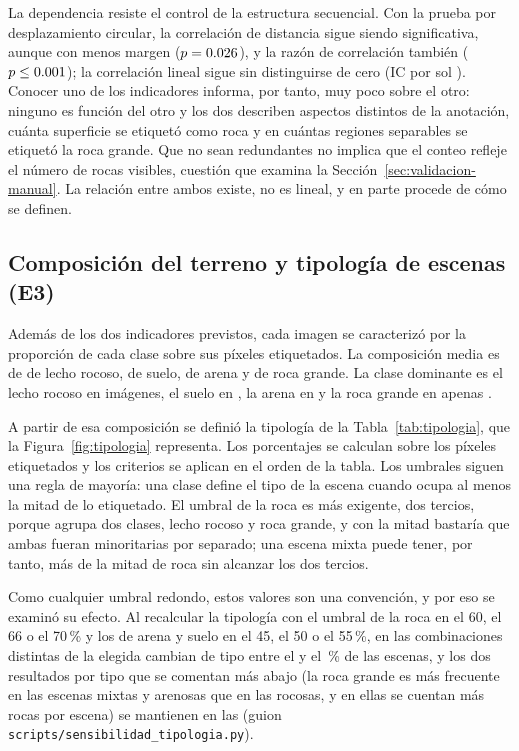 La dependencia resiste el control de la estructura secuencial. Con la prueba por
desplazamiento circular, la correlación de distancia sigue siendo significativa, aunque con
menos margen ($p = \num{0.026}$), y la razón de correlación también ($p \leq \num{0.001}$); la
correlación lineal sigue sin distinguirse de cero (IC por sol \cTempCCIC). Conocer uno
de los indicadores informa, por tanto, muy poco sobre el otro: ninguno es función del otro y
los dos describen aspectos distintos de la anotación, cuánta superficie se etiquetó como roca
y en cuántas regiones separables se etiquetó la roca grande. Que no sean redundantes no
implica que el conteo refleje el número de rocas visibles, cuestión que examina la
Sección~\ref{sec:validacion-manual}. La relación entre ambos existe, no es lineal, y en parte
procede de cómo se definen.

\subsection{Composición del terreno y tipología de escenas (E3)}

Además de los dos indicadores previstos, cada imagen se caracterizó por la proporción de
cada clase sobre sus píxeles etiquetados. La composición media es de \cCompBed{} de lecho
rocoso, \cCompSoil{} de suelo, \cCompSand{} de arena y \cCompBig{} de roca grande. La clase
dominante es el lecho rocoso en \cDomBed{} imágenes, el suelo en \cDomSoil, la arena en
\cDomSand{} y la roca grande en apenas \cDomBig.

A partir de esa composición se definió la tipología de la Tabla~\ref{tab:tipologia}, que la
Figura~\ref{fig:tipologia} representa. Los porcentajes se calculan sobre los píxeles
etiquetados y los criterios se aplican en el orden de la tabla. Los umbrales siguen una regla
de mayoría: una clase define el tipo de la escena cuando ocupa al menos la mitad de lo
etiquetado. El umbral de la roca es más exigente, dos tercios, porque agrupa dos clases, lecho
rocoso y roca grande, y con la mitad bastaría que ambas fueran minoritarias por separado; una
escena mixta puede tener, por tanto, más de la mitad de roca sin alcanzar los dos tercios.

Como cualquier umbral redondo, estos valores son una convención, y por eso se examinó su
efecto. Al recalcular la tipología con el umbral de la roca en el 60, el 66 o el 70\,\% y los
de arena y suelo en el 45, el 50 o el 55\,\%, en las \cTipoSensN{} combinaciones distintas de
la elegida cambian de tipo entre el \cTipoSensCambioMin{} y el \cTipoSensCambioMax\,\% de las
escenas, y los dos resultados por tipo que se comentan más abajo (la roca grande es más
frecuente en las escenas mixtas y arenosas que en las rocosas, y en ellas se cuentan más rocas
por escena) se mantienen en las \cTipoSensMantiene{} (guion
\texttt{scripts/sensibilidad\_tipologia.py}).

